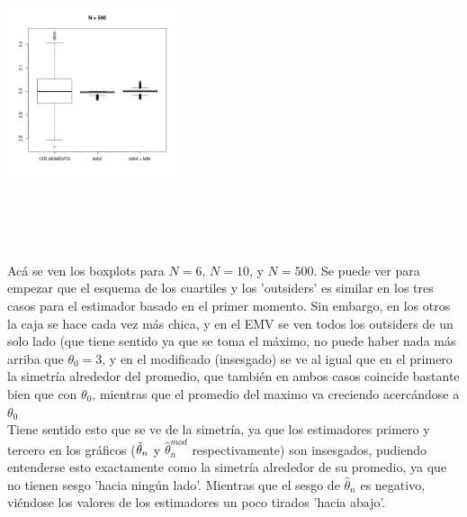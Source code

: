 \documentclass[a4paper]{article}
\begin{document}
\includegraphics[width=5cm,height=9cm,keepaspectratio]{boxplot_500.png}

Acá se ven los boxplots para $N=6$, $N=10$, y $N=500$. Se puede ver para empezar que el esquema de los cuartiles y los 'outsiders' es similar en los tres casos para el estimador basado en el primer momento. Sin embargo, en los otros la caja se hace cada vez más chica, y en el EMV se ven todos los outsiders de un solo lado (que tiene sentido ya que se toma el máximo, no puede haber nada más arriba que $\theta_0 = 3$, y en el modificado (insesgado) se ve al igual que en el primero la simetría alrededor del promedio, que también en ambos casos coincide bastante bien que con $\theta_0$, mientras que el promedio del maximo va creciendo acercándose a $\theta_0$ \\

Tiene sentido esto que se ve de la simetría, ya que los estimadores primero y tercero en los gráficos ($\Tilde{\theta}_n$ y $\widehat{\theta}_n^{mod}$ respectivamente) son insesgados, pudiendo entenderse esto exactamente como la simetría alrededor de su promedio, ya que no tienen sesgo 'hacia ningún lado'. Mientras que el sesgo de $\widehat{\theta}_n$ es negativo, viéndose los valores de los estimadores un poco tirados 'hacia abajo'.
\end{document}
